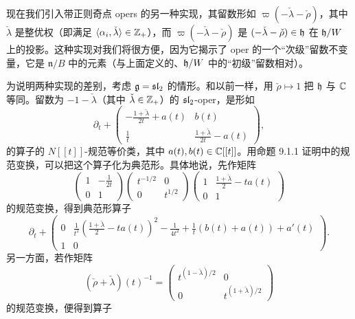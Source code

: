 现在我们引入带正则奇点 opers 的另一种实现，其留数形如 $\varpi(-\check\lambda-\check\rho)$，其中 $\check\lambda$ 是整优权（即满足 $\langle\alpha_i,\check\lambda\rangle\in\mathbb{Z}_+$），而 $\varpi(-\check\lambda-\check\rho)$ 是 $(-\check\lambda-\check\rho)\in\mathfrak{h}$ 在 $\mathfrak{h}/W$ 上的投影。这种实现对我们将很方便，因为它揭示了 oper 的一个“次级”留数不变量，它是 $\mathfrak{n}/B$ 中的元素（与上面定义的、$\mathfrak{h}/W$ 中的“初级”留数相对）。

为说明两种实现的差别，考虑 $\mathfrak{g}=\mathfrak{sl}_2$ 的情形。和以前一样，用 $\check\rho\mapsto 1$ 把 $\mathfrak{h}$ 与 $\mathbb{C}$ 等同。留数为 $-1-\check\lambda$（其中 $\check\lambda\in\mathbb{Z}_+$）的 $\mathfrak{sl}_2$-oper，是形如
\[
\partial_t + \begin{pmatrix} -\frac{1+\check\lambda}{2t}+a(t) & b(t)\\[2pt] \frac{1}{t} & \frac{1+\check\lambda}{2t}-a(t)\end{pmatrix},
\]
的算子的 $N[[t]]$-规范等价类，其中 $a(t),b(t)\in\mathbb{C}[[t]]$。用命题 9.1.1 证明中的规范变换，可以把这个算子化为典范形。具体地说，先作矩阵
\[
\begin{pmatrix} 1 & -\frac{1}{2t}\\[2pt] 0 & 1\end{pmatrix}
\begin{pmatrix} t^{-1/2} & 0\\ 0 & t^{1/2}\end{pmatrix}
\begin{pmatrix} 1 & \frac{1+\check\lambda}{2}-ta(t)\\[2pt] 0 & 1\end{pmatrix}
\]
的规范变换，得到典范形算子
\[
\partial_t + \begin{pmatrix} 0 & \frac{1}{t^2}\left(\frac{1+\check\lambda}{2}-ta(t)\right)^2-\frac{1}{4t^2}+\frac{1}{t}(b(t)+a(t))+a'(t)\\[3pt] 1 & 0\end{pmatrix}.
\]
另一方面，若作矩阵
\[
(\check\rho+\check\lambda)(t)^{-1} = \begin{pmatrix} t^{(1-\check\lambda)/2} & 0\\ 0 & t^{(1+\check\lambda)/2}\end{pmatrix}
\]
的规范变换，便得到算子
